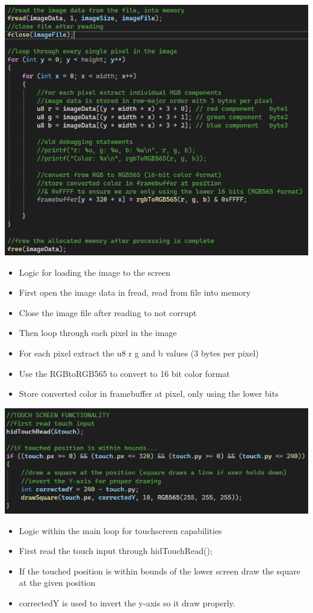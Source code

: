 \documentclass{article}
\begin{document}
 \includegraphics[width=0.75\linewidth]{image5.png}    %
    \begin{itemize}  
        \item \label{forloop} Logic for loading the image to the screen
        \item First open the image data in fread, read from file into memory
        \item Close the image file after reading to not corrupt
        \item Then loop through each pixel in the image
        \item For each pixel extract the u8 r g and b values (3 bytes per pixel)
        \item Use the RGBtoRGB565 to convert to 16 bit color format
        \item Store converted color in framebuffer at pixel, only using the lower bits
    \end{itemize}
\includegraphics[width=0.75\linewidth]{image6.png}    %
    \begin{itemize}
        \item Logic within the main loop for touchscreen capabilities
        \item First read the touch input through hidTouchRead();
        \item If the touched position is within bounds of the lower screen draw the square at the given position
        \item correctedY is used to invert the y-axis so it draw properly. 
    \end{itemize}
\end{document}
